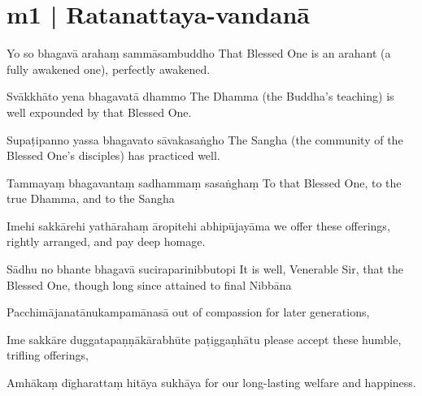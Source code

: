 
\section*{m1 | Ratanattaya-vandanā}\label{sec:m01}

\begin{chantsubsection}
  \chantline
    {Yo so bhagavā arahaṃ sammāsambuddho}
    {That Blessed One is an arahant (a fully awakened one), perfectly awakened.}

  \chantline
    {Svākkhāto yena bhagavatā dhammo}
    {The Dhamma (the Buddha's teaching) is well expounded by that Blessed One.}

  \chantline
    {Supaṭipanno yassa bhagavato sāvakasaṅgho}
    {The Sangha (the community of the Blessed One's disciples) has practiced well.}

  \chantline
    {Tammayaṃ bhagavantaṃ sadhammaṃ sasaṅghaṃ}
    {To that Blessed One, to the true Dhamma, and to the Sangha}

  \chantline
    {Imehi sakkārehi yathārahaṃ āropitehi abhipūjayāma}
    {we offer these offerings, rightly arranged, and pay deep homage.}

  \chantline
    {Sādhu no bhante bhagavā suciraparinibbutopi}
    {It is well, Venerable Sir, that the Blessed One, though long since attained to final Nibbāna}

  \chantline
    {Pacchimājanatānukampamānasā}
    {out of compassion for later generations,}

  \chantline
    {Ime sakkāre duggatapaṇṇākārabhūte paṭiggaṇhātu}
    {please accept these humble, trifling offerings,}

  \chantline
    {Amhākaṃ dīgharattaṃ hitāya sukhāya}
    {for our long-lasting welfare and happiness.}
\end{chantsubsection}
